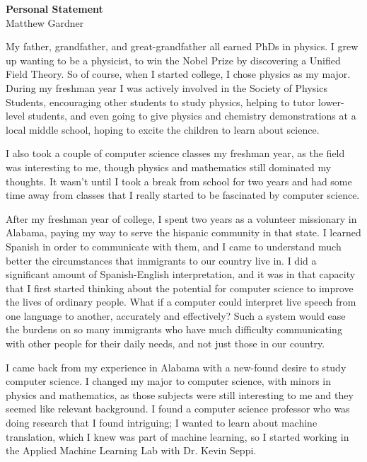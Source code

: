 \documentclass[onecolumn, 12pt]{article}
\begin{document}
\pagestyle{empty}

\begin{center}
  \textbf{Personal Statement}\\
  Matthew Gardner
\end{center}
\vspace{-4mm}

My father, grandfather, and great-grandfather all earned PhDs in physics.  I
grew up wanting to be a physicist, to win the Nobel Prize by discovering a
Unified Field Theory.  So of course, when I started college, I chose physics as
my major.  During my freshman year I was actively involved in the Society of
Physics Students, encouraging other students to study physics, helping to tutor
lower-level students, and even going to give physics and chemistry
demonstrations at a local middle school, hoping to excite the children to learn
about science.

I also took a couple of computer science classes my freshman year, as the field
was interesting to me, though physics and mathematics still dominated my
thoughts.  It wasn't until I took a break from school for two years and had
some time away from classes that I really started to be fascinated by computer
science.

After my freshman year of college, I spent two years as a volunteer missionary
in Alabama, paying my way to serve the hispanic community in that state.  I
learned Spanish in order to communicate with them, and I came to understand
much better the circumstances that immigrants to our country live in.  I did a
significant amount of Spanish-English interpretation, and it was in that
capacity that I first started thinking about the potential for computer science
to improve the lives of ordinary people.  What if a computer could interpret
live speech from one language to another, accurately and effectively?  Such a
system would ease the burdens on so many immigrants who have much difficulty
communicating with other people for their daily needs, and not just those in
our country.

I came back from my experience in Alabama with a new-found desire to study
computer science.  I changed my major to computer science, with minors in
physics and mathematics, as those subjects were still interesting to me and
they seemed like relevant background.  I found a computer science professor who
was doing research that I found intriguing; I wanted to learn about machine
translation, which I knew was part of machine learning, so I started working in
the Applied Machine Learning Lab with Dr. Kevin Seppi.
\end{document}

